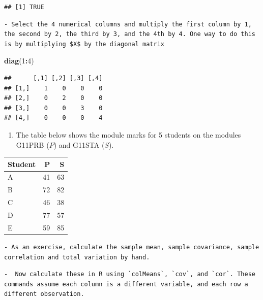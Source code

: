 \documentclass[]{book}
\newenvironment{Shaded}{\begin{snugshade}}{\end{snugshade}}
\newcommand{\DecValTok}[1]{\textcolor[rgb]{0.00,0.00,0.81}{#1}}
\newcommand{\KeywordTok}[1]{\textcolor[rgb]{0.13,0.29,0.53}{\textbf{#1}}}
\newcommand{\NormalTok}[1]{#1}
\newcommand{\OperatorTok}[1]{\textcolor[rgb]{0.81,0.36,0.00}{\textbf{#1}}}
\providecommand{\tightlist}{%
  \setlength{\itemsep}{0pt}\setlength{\parskip}{0pt}}
\theoremstyle{definition}
\theoremstyle{definition}
\theoremstyle{definition}
\theoremstyle{remark}
\begin{document}
\begin{verbatim}
## [1] TRUE
\end{verbatim}

\begin{verbatim}
- Select the 4 numerical columns and multiply the first column by 1, the second by 2, the third by 3, and the 4th by 4. One way to do this is by multiplying $X$ by the diagonal matrix
\end{verbatim}

\begin{Shaded}
\begin{Highlighting}[]
\KeywordTok{diag}\NormalTok{(}\DecValTok{1}\OperatorTok{:}\DecValTok{4}\NormalTok{)}
\end{Highlighting}
\end{Shaded}

\begin{verbatim}
##      [,1] [,2] [,3] [,4]
## [1,]    1    0    0    0
## [2,]    0    2    0    0
## [3,]    0    0    3    0
## [4,]    0    0    0    4
\end{verbatim}

\begin{enumerate}
\def\labelenumi{\arabic{enumi}.}
\setcounter{enumi}{1}
\tightlist
\item
  The table below shows the module marks for 5 students on the modules G11PRB (\(P\)) and G11STA (\(S\)).
\end{enumerate}

\begin{table}[H]
\centering
\begin{tabular}{lrr}
\toprule
Student & P & S\\
\midrule
A & 41 & 63\\
B & 72 & 82\\
C & 46 & 38\\
D & 77 & 57\\
E & 59 & 85\\
\bottomrule
\end{tabular}
\end{table}

\begin{verbatim}
- As an exercise, calculate the sample mean, sample covariance, sample correlation and total variation by hand. 
\end{verbatim}

\begin{verbatim}
-  Now calculate these in R using `colMeans`, `cov`, and `cor`. These commands assume each column is a different variable, and each row a different observation.
\end{verbatim}
\end{document}

